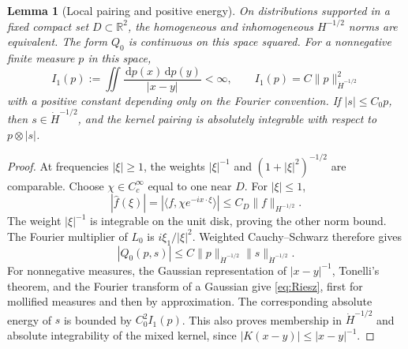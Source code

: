 \documentclass[11pt,a4paper]{article}
\newtheorem{lemma}[theorem]{Lemma}
\theoremstyle{definition}\newtheorem{definition}[theorem]{Definition}
\theoremstyle{remark}\newtheorem{remark}[theorem]{Remark}
\newcommand{\R}{\mathbb R}
\newcommand{\dd}{\,\mathrm d}
\newcommand{\ip}[2]{\langle #1,#2\rangle}
\newcommand{\norm}[1]{\lVert #1\rVert}
\newcommand{\Hh}{H^{-1/2}}
\newcommand{\Hdot}{\dot H^{-1/2}}
\numberwithin{equation}{section}
\begin{document}
\begin{lemma}[Local pairing and positive energy]\label{lem:energy}
On distributions supported in a fixed compact set $D\subset\R^2$, the homogeneous and inhomogeneous $H^{-1/2}$ norms are equivalent. The form $Q_0$ is continuous on this space squared. For a nonnegative finite measure $p$ in this space,
\begin{equation}\label{eq:Riesz}
 I_1(p):=\iint\frac{\dd p(x)\dd p(y)}{|x-y|}<\infty,
 \qquad I_1(p)=C\norm{p}_{\Hdot}^2
\end{equation}
with a positive constant depending only on the Fourier convention. If $|s|\le C_0p$, then $s\in\Hdot$, and the kernel pairing is absolutely integrable with respect to $p\otimes|s|$.
\end{lemma}
\begin{proof}
At frequencies $|\xi|\ge1$, the weights $|\xi|^{-1}$ and $(1+|\xi|^2)^{-1/2}$ are comparable. Choose $\chi\in C_c^\infty$ equal to one near $D$. For $|\xi|\le1$,
\[
 |\widehat f(\xi)|=|\ip{f}{\chi e^{-ix\cdot\xi}}|
 \le C_D\norm{f}_{\Hh}.
\]
The weight $|\xi|^{-1}$ is integrable on the unit disk, proving the other norm bound. The Fourier multiplier of $L_0$ is $i\xi_1/|\xi|^2$. Weighted Cauchy--Schwarz therefore gives
\[
 |Q_0(p,s)|\le C\norm{p}_{\Hdot}\norm{s}_{\Hdot}.
\]
For nonnegative measures, the Gaussian representation of $|x-y|^{-1}$, Tonelli's theorem, and the Fourier transform of a Gaussian give \eqref{eq:Riesz}, first for mollified measures and then by approximation. The corresponding absolute energy of $s$ is bounded by $C_0^2I_1(p)$. This also proves membership in $\Hdot$ and absolute integrability of the mixed kernel, since $|K(x-y)|\le|x-y|^{-1}$.
\end{proof}
\end{document}
